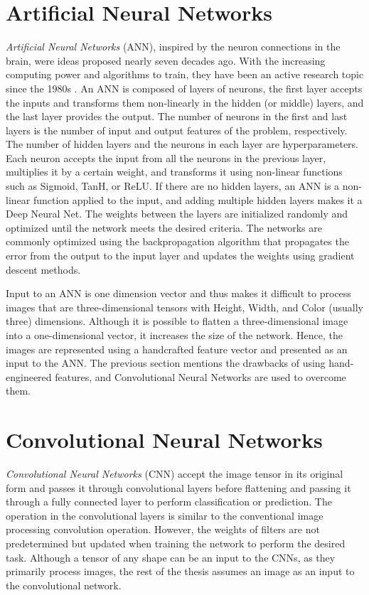 \section{Artificial Neural Networks}

\emph{Artificial Neural Networks} (ANN), inspired by the neuron connections in the brain, were ideas proposed nearly seven decades ago. With the increasing computing power and algorithms to train, they have been an active research topic since the 1980s \cite{goodfellow2016deep}. An ANN is composed of layers of neurons, the first layer accepts the inputs and transforms them non-linearly in the hidden (or middle) layers, and the last layer provides the output. The number of neurons in the first and last layers is the number of input and output features of the problem, respectively. The number of hidden layers and the neurons in each layer are hyperparameters. Each neuron accepts the input from all the neurons in the previous layer, multiplies it by a certain weight, and transforms it using non-linear functions such as Sigmoid, TanH, or ReLU. If there are no hidden layers, an ANN is a non-linear function applied to the input, and adding multiple hidden layers makes it a Deep Neural Net. The weights between the layers are initialized randomly and optimized until the network meets the desired criteria. The networks are commonly optimized using the backpropagation algorithm that propagates the error from the output to the input layer and updates the weights using gradient descent methods. 

Input to an ANN is one dimension vector and thus makes it difficult to process images that are three-dimensional tensors with Height, Width, and Color (usually three) dimensions. Although it is possible to flatten a three-dimensional image into a one-dimensional vector, it increases the size of the network. Hence, the images are represented using a handcrafted feature vector and presented as an input to the ANN. The previous section mentions the drawbacks of using hand-engineered features, and Convolutional Neural Networks are used to overcome them.

\section{Convolutional Neural Networks}

\emph{Convolutional Neural Networks} (CNN) accept the image tensor in its original form and passes it through convolutional layers before flattening and passing it through a fully connected layer to perform classification or prediction. The operation in the convolutional layers is similar to the conventional image processing convolution operation. However, the weights of filters are not predetermined but updated when training the network to perform the desired task. Although a tensor of any shape can be an input to the CNNs, as they primarily process images, the rest of the thesis assumes an image as an input to the convolutional network.

